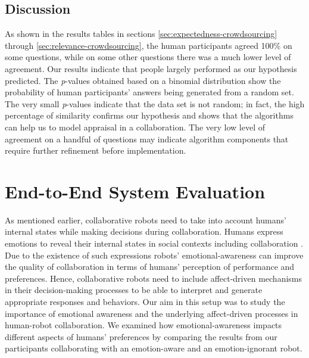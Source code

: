 \documentclass[12pt]{report}
\begin{document}
\subsection{Discussion}
\label{sec:discussion-crowdsourcing}
As shown in the results tables in sections \ref{sec:expectedness-crowdsourcing}
through \ref{sec:relevance-crowdsourcing}, the human participants agreed 100\%
on some questions, while on some other questions there was a much lower level of
agreement. Our results indicate that people largely performed as our hypothesis
predicted. The \textit{p}-values obtained based on a binomial distribution show
the probability of human participants' answers being generated from a random
set. The very small \textit{p}-values indicate that the data set is not random;
in fact, the high percentage of similarity confirms our hypothesis and shows
that the algorithms can help us to model appraisal in a collaboration. The very
low level of agreement on a handful of questions may indicate algorithm
components that require further refinement before implementation. 



\section{End-to-End System Evaluation}
\label{sec:end-to-end}

As mentioned earlier, collaborative robots need to take into account humans'
internal states while making decisions during collaboration. Humans express
emotions to reveal their internal states in social contexts including
collaboration \cite{breazeal:sociable-interactive-robots}. Due to the existence
of such expressions robots' emotional-awareness can improve the quality of
collaboration in terms of humans' perception of performance and preferences.
Hence, collaborative robots need to include affect-driven mechanisms in their
decision-making processes to be able to interpret and generate appropriate
responses and behaviors. Our aim in this setup was to study the importance of
emotional awareness and the underlying affect-driven processes in human-robot
collaboration. We examined how emotional-awareness impacts different aspects of
humans' preferences by comparing the results from our participants collaborating
with an emotion-aware and an emotion-ignorant robot.
\end{document}
